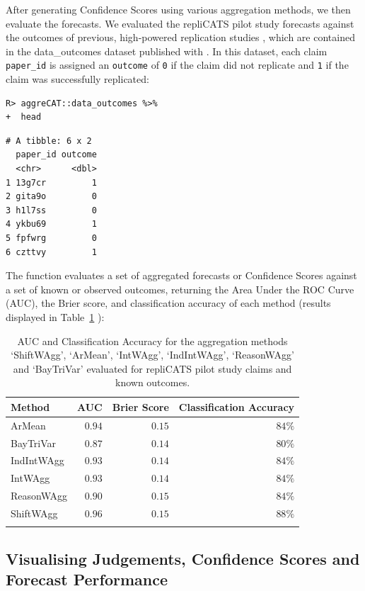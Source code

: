\documentclass[article]{jss}
\newcommand{\fct}[1]{\code{#1()}}
\begin{document}
After generating Confidence Scores using various aggregation methods, we
then evaluate the forecasts. We evaluated the repliCATS pilot study
forecasts against the outcomes of previous, high-powered replication
studies \citep{Hanea2021}, which are contained in the {data\_outcomes}
dataset published with . In this dataset, each claim
\texttt{paper\_id} is assigned an \texttt{outcome} of \texttt{0} if the
claim did not replicate and \texttt{1} if the claim was successfully
replicated:

\begin{verbatim}
R> aggreCAT::data_outcomes %>% 
+  head
\end{verbatim}

\begin{verbatim}
# A tibble: 6 x 2
  paper_id outcome
  <chr>      <dbl>
1 13g7cr         1
2 gita9o         0
3 h1l7ss         0
4 ykbu69         1
5 fpfwrg         0
6 czttvy         1
\end{verbatim}

The function \fct{confidence\_score\_evaluation} evaluates a set of
aggregated forecasts or Confidence Scores against a set of known or
observed outcomes, returning the Area Under the ROC Curve (AUC), the
Brier score, and classification accuracy of each method (results
displayed in Table~\ref{tbl-multi-method-workflow-eval} ):

\hypertarget{tbl-multi-method-workflow-eval}{}
\begin{longtable}{lrrr}

\toprule
Method & AUC & Brier Score & Classification Accuracy \\ 
\midrule
ArMean & $0.94$ & $0.15$ & $84\%$ \\ 
BayTriVar & $0.87$ & $0.14$ & $80\%$ \\ 
IndIntWAgg & $0.93$ & $0.14$ & $84\%$ \\ 
IntWAgg & $0.93$ & $0.14$ & $84\%$ \\ 
ReasonWAgg & $0.90$ & $0.15$ & $84\%$ \\ 
ShiftWAgg & $0.96$ & $0.15$ & $88\%$ \\ 
\bottomrule
\caption{\label{tbl-multi-method-workflow-eval}AUC and Classification Accuracy for the aggregation methods `ShiftWAgg',
`ArMean', `IntWAgg', `IndIntWAgg', `ReasonWAgg' and `BayTriVar'
evaluated for repliCATS pilot study claims and known outcomes. }\tabularnewline
\end{longtable}

\hypertarget{visualising-judgements-confidence-scores-and-forecast-performance}{%
\subsection{Visualising Judgements, Confidence Scores and Forecast
Performance}\label{visualising-judgements-confidence-scores-and-forecast-performance}}
\end{document}
